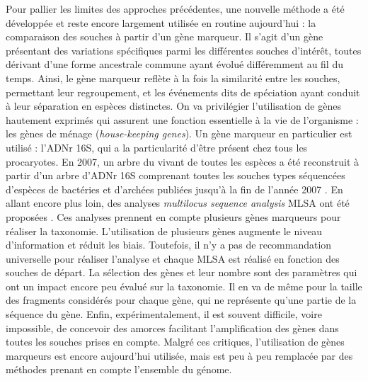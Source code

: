 Pour pallier les limites des approches précédentes, une nouvelle méthode a été développée et reste encore largement utilisée en routine aujourd'hui : la comparaison des souches à partir d'un gène marqueur. Il s'agit d'un gène présentant des variations spécifiques parmi les différentes souches d'intérêt, toutes dérivant d'une forme ancestrale commune ayant évolué différemment au fil du temps. Ainsi, le gène marqueur reflète à la fois la similarité entre les souches, permettant leur regroupement, et les événements dits de spéciation ayant conduit à leur séparation en espèces distinctes. On va privilégier l'utilisation de gènes hautement exprimés qui assurent une fonction essentielle à la vie de l'organisme : les gènes de ménage (\textit{house-keeping genes}). Un gène marqueur en particulier est utilisé : l'ADNr 16S, qui a la particularité d'être présent chez tous les procaryotes. En 2007, un arbre du vivant de toutes les espèces a été reconstruit à partir d'un arbre d'ADNr 16S comprenant toutes les souches types séquencées d'espèces de bactéries et d'archées publiées jusqu'à la fin de l'année 2007 \cite{yarza_all-species_2008}. 
En allant encore plus loin, des analyses \textit{multilocus sequence analysis} MLSA ont été proposées \cite{glaeser_multilocus_2015}. Ces analyses prennent en compte plusieurs gènes marqueurs pour réaliser la taxonomie. L'utilisation de plusieurs gènes augmente le niveau d'information et réduit les biais. Toutefois, il n'y a pas de recommandation universelle pour réaliser l'analyse et chaque MLSA est réalisé en fonction des souches de départ. La sélection des gènes et leur nombre sont des paramètres qui ont un impact encore peu évalué sur la taxonomie. Il en va de même pour la taille des fragments considérés pour chaque gène, qui ne représente qu'une partie de la séquence du gène. Enfin, expérimentalement, il est souvent difficile, voire impossible, de concevoir des amorces facilitant l'amplification des gènes dans toutes les souches prises en compte. Malgré ces critiques, l'utilisation de gènes marqueurs est encore aujourd'hui utilisée, mais est peu à peu remplacée par des méthodes prenant en compte l'ensemble du génome.

